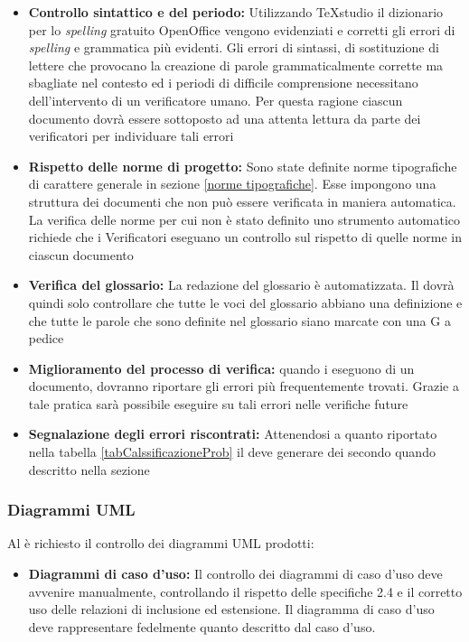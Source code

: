 \documentclass[12pt,a4paper]{article}
\begin{document}
\begin{itemize}
	\item \textbf{Controllo sintattico e del periodo:} Utilizzando TeXstudio il dizionario per lo \textit{spelling} gratuito OpenOffice vengono evidenziati e corretti gli errori di \textit{spelling} e grammatica più evidenti. Gli errori di sintassi, di sostituzione di lettere che provocano la creazione di parole grammaticalmente corrette ma sbagliate nel contesto ed i periodi di difficile comprensione necessitano dell'intervento di un verificatore umano. Per questa ragione ciascun documento dovrà essere sottoposto ad una attenta lettura da parte dei verificatori per individuare tali errori
	\item \textbf{Rispetto delle norme di progetto:} Sono state definite norme tipografiche di carattere generale in \NdP{} sezione \ref{norme tipografiche}. Esse impongono una struttura dei documenti che non può essere verificata in maniera automatica. La verifica delle norme per cui non è stato definito uno strumento automatico richiede che i Verificatori eseguano un controllo sul rispetto di quelle norme in ciascun documento
	\item \textbf{Verifica del glossario:} La redazione del glossario è automatizzata. Il \VR{} dovrà quindi solo controllare che tutte le voci del glossario abbiano una definizione e che tutte le parole che sono definite nel glossario siano marcate con una G a pedice	
	\item \textbf{Miglioramento del processo di verifica:} quando i \VRpl{} eseguono \emph{} di un documento, dovranno riportare gli errori più frequentemente trovati. Grazie a tale pratica sarà possibile eseguire \emph{} su tali errori nelle verifiche future
	\item \textbf{Segnalazione degli errori riscontrati:} Attenendosi a quanto riportato nella tabella \ref{tabCalssificazioneProb} il \VR{} deve generare dei \textit{} secondo quando descritto nella sezione \TODO{}
\end{itemize}

\subsubsection{Diagrammi UML}
Al \VR{} è richiesto il controllo dei diagrammi UML prodotti:
\begin{itemize}
	\item \textbf{Diagrammi di caso d'uso:} Il controllo dei diagrammi di caso d'uso deve avvenire manualmente, controllando il rispetto delle specifiche  2.4 e il corretto uso delle relazioni di inclusione ed estensione. Il diagramma di caso d'uso deve rappresentare fedelmente quanto descritto dal caso d'uso.
\end{itemize}
\end{document}
